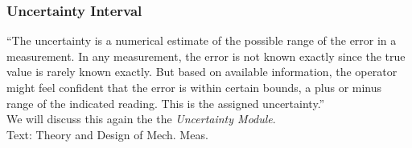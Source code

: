 \documentclass[fleqn]{beamer} %
\newcommand{\sectiontitleIV}{Uncertainty Interval}
\begin{document}
\begin{frame}[label=sectionIV]
\frametitle{\sectiontitleIV}

``The {\BL uncertainty} is a numerical estimate of the possible range of the error in a measurement. In any
measurement, the {\RD error} is not known exactly since the true value is rarely known exactly. But based on
available information, the operator might feel confident that the error is within certain bounds, a plus
or minus range of the indicated reading. This is the assigned {\BL uncertainty}.''\vspace{5mm}\\
We will discuss this again the the {\it Uncertainty Module}.\vspace{10mm}\\

{\tiny Text: Theory and Design of Mech. Meas.}
\end{frame}
\end{document}
